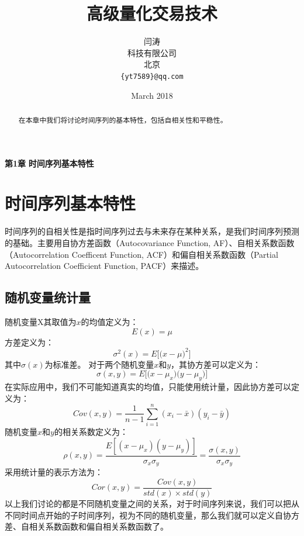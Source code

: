 \documentclass{article}
\title{高级量化交易技术}
\author{
  闫涛 \\
  科技有限公司\\
  北京 \\
  \texttt{\{yt7589\}@qq.com} \\
}
\date{March 2018}
\begin{document}
\maketitle
\begin{center}
\Large \textbf{第1章} \quad \textbf{时间序列基本特性}
\end{center}
\begin{abstract}
在本章中我们将讨论时间序列的基本特性，包括自相关性和平稳性。
\end{abstract}
\section{时间序列基本特性}
时间序列的自相关性是指时间序列过去与未来存在某种关系，是我们时间序列预测的基础。主要用自协方差函数（Autocovariance Function, AF）、自相关系数函数（Autocorrelation Coefficent Function, ACF）和偏自相关系数函数（Partial Autocorrelation Coefficient Function, PACF）来描述。
\subsection{随机变量统计量}
随机变量X其取值为$x$的均值定义为：
\begin{equation}
E(x) = \mu
\label{e000001}
\end{equation}
方差定义为：
\begin{equation}
\sigma ^{2} (x) = E\bigg[ \big( x - \mu \big)^{2} \bigg]
\label{e000002}
\end{equation}
其中$\sigma (x)$为标准差。
对于两个随机变量$x$和$y$，其协方差可以定义为：
\begin{equation}
\sigma (x, y) = E\bigg[ \big( x - \mu _{x} \big) \big( y - \mu _{y} \big) \bigg]
\label{e000003}
\end{equation}
在实际应用中，我们不可能知道真实的均值，只能使用统计量，因此协方差可以定义为：
\begin{equation}
Cov(x, y) = \frac{1}{n-1} \sum_{i=1}^{n} (x_{i} - \bar{x})(y_{i} - \bar{y})
\label{e000004}
\end{equation}
随机变量$x$和$y$的相关系数定义为：
\begin{equation}
\rho(x,y)=\frac{E[(x-\mu_{x})(y-\mu_{y})]}{\sigma _{x} \sigma _{y}}=\frac{\sigma(x,y)}{\sigma _{x} \sigma _{y}}
\label{e000005}
\end{equation}
采用统计量的表示方法为：
\begin{equation}
Cor(x,y)=\frac{Cov(x,y)}{std(x) \times std(y)}
\label{e000006}
\end{equation}
以上我们讨论的都是不同随机变量之间的关系，对于时间序列来说，我们可以把从不同时间点开始的子时间序列，视为不同的随机变量，那么我们就可以定义自协方差、自相关系数函数和偏自相关系数函数了。\newline
\end{document}
